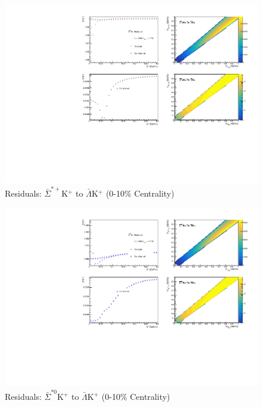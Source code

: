 \documentclass[../AnalysisNoteJBuxton.tex]{subfiles}
\begin{document}
\begin{figure}[h]
  \centering
  \includegraphics[width=\textwidth]{9_AdditionalFigures/Figures/Residuals/ALamKchP/Residuals_ALamKchP_0010_ASigStPKchP_MomResCrctn_NonFlatBgdCrctn_10Res_PrimMaxDecay4fm_UsingXiDataAndCoulombOnly.pdf}
  \caption[Residuals: $\bar{\Sigma}^{*+}$K$^{+}$ to $\bar{\Lambda}$K$^{+}$ (0-10\% Centrality)]{Residuals: $\bar{\Sigma}^{*+}$K$^{+}$ to $\bar{\Lambda}$K$^{+}$ (0-10\% Centrality)}
  \label{fig:Res_ALamKchP_0010_ASigStPKchP}
\end{figure}

\begin{figure}[h]
  \centering
  \includegraphics[width=\textwidth]{9_AdditionalFigures/Figures/Residuals/ALamKchP/Residuals_ALamKchP_0010_ASigSt0KchP_MomResCrctn_NonFlatBgdCrctn_10Res_PrimMaxDecay4fm_UsingXiDataAndCoulombOnly.pdf}
  \caption[Residuals: $\bar{\Sigma}^{*0}$K$^{+}$ to $\bar{\Lambda}$K$^{+}$ (0-10\% Centrality)]{Residuals: $\bar{\Sigma}^{*0}$K$^{+}$ to $\bar{\Lambda}$K$^{+}$ (0-10\% Centrality)}
  \label{fig:Res_ALamKchP_0010_ASigSt0KchP}
\end{figure}
\end{document}
